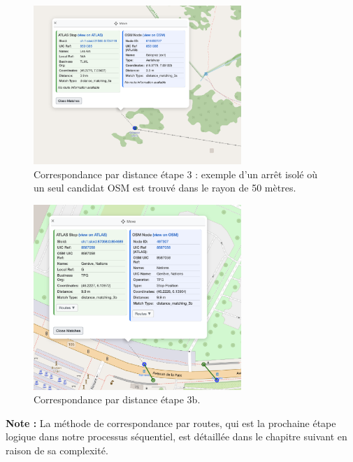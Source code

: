 \begin{figure}[h] 
    \centering
    \includegraphics[width=0.7\textwidth]{../figures/correspondances/distance_3a.png}
    \caption[Correspondance par distance – étape 3a]{Correspondance par distance étape 3 : exemple d'un arrêt isolé où un seul candidat OSM est trouvé dans le rayon de 50 mètres.}
    \label{fig:distance_stage3}
\end{figure} 
\begin{figure}[h] 
    \centering
    \includegraphics[width=0.7\textwidth]{../figures/correspondances/distance_3b.png}
    \caption[Correspondance par distance – étape 3b]{Correspondance par distance étape 3b.}
    \label{fig:distance_stage3b}
\end{figure} 

\begin{tcolorbox}[colback=white, colframe=black!80, arc=3mm, boxrule=1pt]
\textbf{Note :} La méthode de correspondance par routes, qui est la prochaine étape logique dans notre processus séquentiel, est détaillée dans le chapitre suivant en raison de sa complexité.
\end{tcolorbox}

